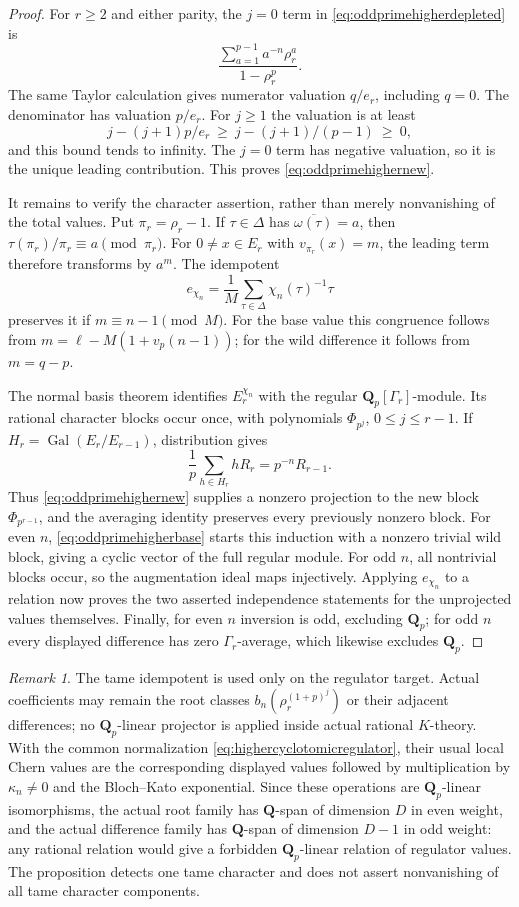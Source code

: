 \documentclass[11pt,a4paper]{article}
\theoremstyle{remark}
\newtheorem{remark}[theorem]{Remark}
\newcommand{\Q}{\mathbf Q}
\newcommand{\Gal}{\operatorname{Gal}}
\begin{document}
\begin{proof}
For $r\geq2$ and either parity, the $j=0$ term in
\eqref{eq:oddprimehigherdepleted} is
\[
 \frac{\sum_{a=1}^{p-1}a^{-n}\rho_r^a}{1-\rho_r^p}.
\]
The same Taylor calculation gives numerator valuation $q/e_r$,
including $q=0$. The denominator has valuation $p/e_r$.
For $j\geq1$ the valuation is at least
\[
 j-(j+1)p/e_r\ \geq\ j-(j+1)/(p-1)\ \geq\ 0,
\]
and this bound tends to infinity. The $j=0$ term has negative
valuation, so it is the unique leading contribution. This proves
\eqref{eq:oddprimehighernew}.

It remains to verify the character assertion, rather than merely
nonvanishing of the total values. Put $\pi_r=\rho_r-1$.
If $\tau\in\Delta$ has $\overline{\omega(\tau)}=a$, then
$\tau(\pi_r)/\pi_r\equiv a\pmod{\pi_r}$.
For $0\ne x\in E_r$ with $v_{\pi_r}(x)=m$, the leading term
therefore transforms by $a^m$. The idempotent
\[
 e_{\chi_n}=\frac1M\sum_{\tau\in\Delta}\chi_n(\tau)^{-1}\tau
\]
preserves it if $m\equiv n-1\pmod M$.
For the base value this congruence follows from
$m=\ell-M(1+v_p(n-1))$; for the wild difference it follows
from $m=q-p$.

The normal basis theorem identifies $E_r^{\chi_n}$ with the
regular $\Q_p[\Gamma_r]$-module. Its rational character blocks
occur once, with polynomials $\Phi_{p^j}$, $0\leq j\leq r-1$.
If $H_r=\Gal(E_r/E_{r-1})$, distribution gives
\[
 \frac1p\sum_{h\in H_r}hR_r=p^{-n}R_{r-1}.
\]
Thus \eqref{eq:oddprimehighernew} supplies a nonzero projection
to the new block $\Phi_{p^{r-1}}$, and the averaging identity
preserves every previously nonzero block.
For even $n$, \eqref{eq:oddprimehigherbase} starts this induction
with a nonzero trivial wild block, giving a cyclic vector of
the full regular module. For odd $n$, all nontrivial blocks
occur, so the augmentation ideal maps injectively.
Applying $e_{\chi_n}$ to a relation now proves the two asserted
independence statements for the unprojected values themselves.
Finally, for even $n$ inversion is odd, excluding $\Q_p$;
for odd $n$ every displayed difference has zero $\Gamma_r$-average,
which likewise excludes $\Q_p$.
\end{proof}

\begin{remark}
The tame idempotent is used only on the regulator target.
Actual coefficients may remain the root classes
$b_n(\rho_r^{(1+p)^j})$ or their adjacent differences; no
$\Q_p$-linear projector is applied inside actual rational
$K$-theory. With the common normalization
\eqref{eq:highercyclotomicregulator}, their usual local Chern
values are the corresponding displayed values followed by
multiplication by $\kappa_n\ne0$ and the Bloch--Kato exponential.
Since these operations are $\Q_p$-linear isomorphisms, the
actual root family has $\Q$-span of dimension $D$ in even
weight, and the actual difference family has $\Q$-span of
dimension $D-1$ in odd weight: any rational relation would
give a forbidden $\Q_p$-linear relation of regulator values.
The proposition detects one tame character and
does not assert nonvanishing of all tame character components.
\end{remark}
\end{document}
